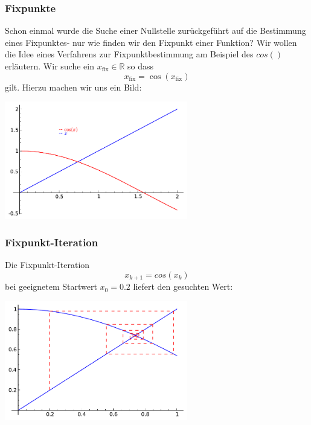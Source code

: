 \documentclass[fontsize=12pt,paper=a4,twoside,bibtotoc,idxtotoc,
liststotoc,pagesize,BCOR1.2cm,DIV15,chapterprefix,pagesize=pdftex]{scrbook}
\theoremstyle{plain}
\theoremstyle{definition}
\theoremstyle{remark}
\begin{document}
\subsubsection{Fixpunkte}
Schon einmal wurde die Suche einer Nullstelle zurückgeführt auf die Bestimmung eines Fixpunktes- nur wie finden wir den Fixpunkt einer Funktion? Wir wollen die Idee 
eines Verfahrens zur Fixpunktbestimmung am Beispiel des $cos()$ erläutern. Wir suche ein $x_{\mathrm{fix}} \in \mathbb{R}$ so dass
\[ x_{\mathrm{fix}} = \cos (x_{\mathrm{fix}}) \]
gilt. Hierzu machen wir uns ein Bild:
\begin{center}
\includegraphics[width=8cm]{iter1.pdf}
\end{center}
\subsubsection{Fixpunkt-Iteration}
Die Fixpunkt-Iteration 
\[ x_{k+1}=cos(x_k) \]
bei geeignetem Startwert $x_0 = 0.2$ liefert den gesuchten Wert:
\begin{center}
\includegraphics[width=8cm]{fixpunkt.pdf}
\end{center}
\end{document}
